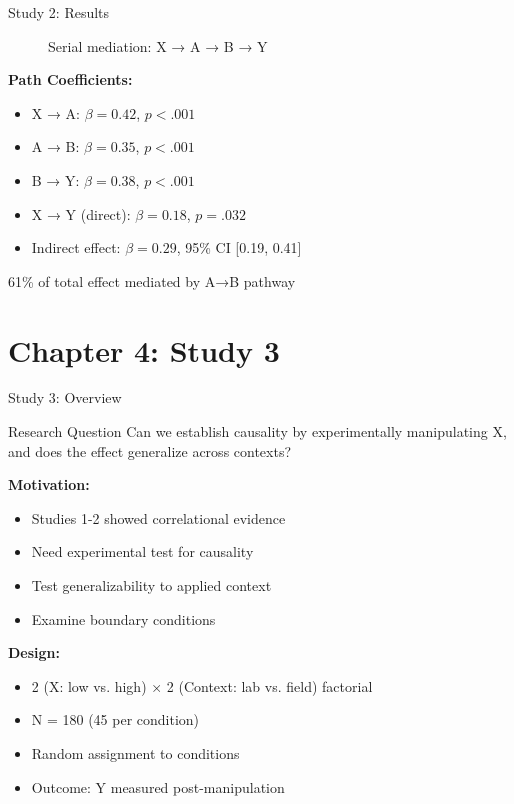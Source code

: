 \documentclass[aspectratio=169,12pt]{beamer}
\begin{document}
\begin{frame}{Study 2: Results}
  \begin{figure}
    \centering
    \caption{Serial mediation: X → A → B → Y}
  \end{figure}

  \vspace{0.5cm}

  \textbf{Path Coefficients:}
  \begin{itemize}
    \item X → A: $\beta = 0.42$, $p < .001$
    \item A → B: $\beta = 0.35$, $p < .001$
    \item B → Y: $\beta = 0.38$, $p < .001$
    \item X → Y (direct): $\beta = 0.18$, $p = .032$
    \item Indirect effect: $\beta = 0.29$, 95\% CI [0.19, 0.41]
  \end{itemize}

  \alert{61\% of total effect mediated by A→B pathway}
\end{frame}


\section{Chapter 4: Study 3}

\begin{frame}{Study 3: Overview}
  \begin{alertblock}{Research Question}
    Can we establish causality by experimentally manipulating X, and does the effect generalize across contexts?
  \end{alertblock}

  \vspace{0.5cm}

  \textbf{Motivation:}
  \begin{itemize}
    \item Studies 1-2 showed correlational evidence
    \item Need experimental test for causality
    \item Test generalizability to applied context
    \item Examine boundary conditions
  \end{itemize}

  \vspace{0.5cm}

  \textbf{Design:}
  \begin{itemize}
    \item 2 (X: low vs. high) × 2 (Context: lab vs. field) factorial
    \item N = 180 (45 per condition)
    \item Random assignment to conditions
    \item Outcome: Y measured post-manipulation
  \end{itemize}
\end{frame}
\end{document}
